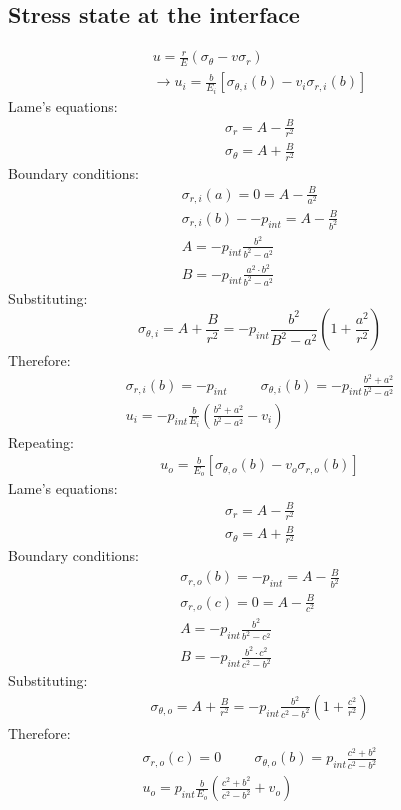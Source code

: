 \documentclass[class=report, crop=false, 12pt,a4paper]{standalone}
\begin{document}
\subsection{Stress state at the interface}
\begin{gather}
    u = \frac{r}{E}\left(\sigma_{\theta} - v \sigma_r\right)\\
    \rightarrow u_i = \frac{b}{E_i}\left[\sigma_{\theta, i} \left(b\right) - v_i \sigma_{r,i} (b)\right]
\end{gather}
Lame's equations:
\begin{gather}
    \sigma_r = A - \frac{B}{r^2}\\
    \sigma_{\theta} = A + \frac{B}{r^2}
\end{gather}
Boundary conditions:
\begin{gather}
    \sigma_{r,i}(a) = 0 = A - \frac{B}{a^2}\\
    \sigma_{r,i}(b) - -p_{int} = A - \frac{B}{b^2}\\
    A = -p_{int}\frac{b^2}{b^2 - a^2}\\
    B = -p_{int}\frac{a^2 \cdot b^2}{b^2 - a^2}
\end{gather}
Substituting:
\begin{equation}
    \sigma_{\theta,i} = A + \frac{B}{r^2} = -p_{int}\frac{b^2}{B^2 - a^2} \left(1 + \frac{a^2}{r^2}\right)
\end{equation}
Therefore:
\begin{gather}
    \sigma_{r,i}(b) = -p_{int} \hspace{1cm} \sigma_{\theta,i}(b) = -p_{int}\frac{b^2 + a^2}{b^2 - a^2}\\
    u_i = -p_{int} \frac{b}{E_i} \left(\frac{b^2 + a^2}{b^2 - a^2} - v_i\right)
\end{gather}
Repeating:
\begin{gather}
    u_o = \frac{b}{E_o}\left[\sigma_{\theta,o} (b) - v_o \sigma_{r,o}(b)\right]
\end{gather}
Lame's equations:
\begin{gather}
    \sigma_r = A - \frac{B}{r^2}\\
    \sigma_{\theta} = A + \frac{B}{r^2}
\end{gather}
Boundary conditions:
\begin{gather}
    \sigma_{r,o}(b) = -p_{int} = A - \frac{B}{b^2}\\
    \sigma_{r,o}(c) = 0 = A - \frac{B}{c^2}\\
    A = -p_{int} \frac{b^2}{b^2- c^2}\\
    B = -p_{int} \frac{b^2 \cdot c^2}{c^2 - b^2}
\end{gather}
Substituting:
\begin{gather}
    \sigma_{\theta,o} = A + \frac{B}{r^2} = -p_{int} \frac{b^2}{c^2 - b^2} \left(1+ \frac{c^2}{r^2}\right)
\end{gather}
Therefore:
\begin{gather}
    \sigma_{r,o}(c) = 0 \hspace{1cm} \sigma_{\theta,o}(b) = p_{int}\frac{c^2 + b^2}{c^2 -b^2}\\
    u_o = p_{int} \frac{b}{E_o}\left(\frac{c^2 + b^2}{c^2 - b^2} + v_o\right)
\end{gather}
\end{document}
